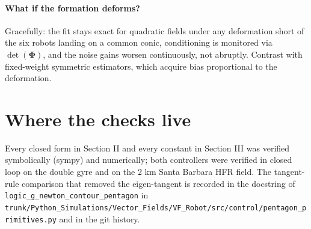 \documentclass[11pt]{article}
\begin{document}
\paragraph{What if the formation deforms?} Gracefully: the fit stays exact
for quadratic fields under any deformation short of the six robots landing
on a common conic, conditioning is monitored via $\det(\boldsymbol{\Phi})$,
and the noise gains worsen continuously, not abruptly. Contrast with
fixed-weight symmetric estimators, which acquire bias proportional to the
deformation.

\section{Where the checks live}

Every closed form in Section II and every constant in Section III was
verified symbolically (sympy) and numerically; both controllers were
verified in closed loop on the double gyre and on the 2 km Santa Barbara
HFR field. The tangent-rule comparison that removed the eigen-tangent is
recorded in the docstring of \texttt{logic\_g\_newton\_contour\_pentagon}
in
\texttt{trunk/Python\_Simulations/Vector\_Fields/VF\_Robot/src/control/pentagon\_primitives.py}
and in the git history.
\end{document}
